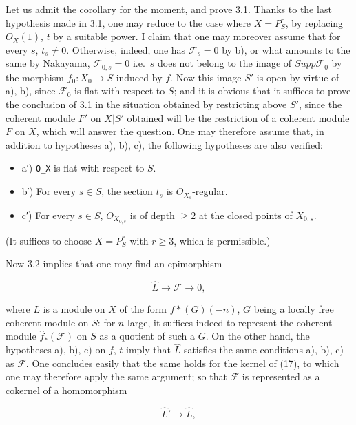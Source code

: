 \documentclass[
  11pt,
  a4paper,
]{book}
\providecommand{\tightlist}{%
  \setlength{\itemsep}{0pt}\setlength{\parskip}{0pt}}
\begin{document}
Let us admit the corollary for the moment, and prove 3.1. Thanks to the
last hypothesis made in 3.1, one may reduce to the case where
\(X = P^{r}_{S}\), by replacing \(O_{X}(1)\), \(t\) by a suitable power.
I claim that one may moreover assume that for every \(s\),
\(t_{s} \neq 0\). Otherwise, indeed, one has \(\mathcal{F}_{s} = 0\) by
b), or what amounts to the same by Nakayama, \(\mathcal{F}_{0,s} = 0\)
i.e.~\(s\) does not belong to the image of \(Supp \mathcal{F}_{0}\) by
the morphism \(f_{0}: X_{0} \to S\) induced by \(f\). Now this image
\(S'\) is open by virtue of a), b), since \(\mathcal{F}_{0}\) is flat
with respect to \(S\); and it is obvious that it suffices to prove the
conclusion of 3.1 in the situation obtained by restricting above \(S'\),
since the coherent module \(F'\) on \(X|S'\) obtained will be the
restriction of a coherent module \(F\) on \(X\), which will answer the
question. One may therefore assume that, in addition to hypotheses a),
b), c), the following hypotheses are also verified:

\begin{itemize}
\tightlist
\item
  a′) \texttt{O\_X} is flat with respect to \(S\).
\item
  b′) For every \(s \in S\), the section \(t_{s}\) is
  \(O_{X_{s}}\)-regular.
\item
  c′) For every \(s \in S\), \(O_{X_{0,s}}\) is of depth \(\geqslant 2\)
  at the closed points of \(X_{0,s}\).
\end{itemize}

(It suffices to choose \(X = P^{r}_{S}\) with \(r \geqslant 3\), which
is permissible.)

Now 3.2 implies that one may find an epimorphism

\[ \hat{L} \to \mathcal{F} \to 0, \]

where \(L\) is a module on \(X\) of the form \(f*(G)(-n)\), \(G\) being
a locally free coherent module on \(S\): for \(n\) large, it suffices
indeed to represent the coherent module \(\hat{f}_{\ast}(\mathcal{F})\)
on \(S\) as a quotient of such a \(G\). On the other hand, the
hypotheses a), b), c) on \(f\), \(t\) imply that \(\hat{L}\) satisfies
the same conditions a), b), c) as \(\mathcal{F}\). One concludes easily
that the same holds for the kernel of (17), to which one may therefore
apply the same argument; so that \(\mathcal{F}\) is represented as a
cokernel of a homomorphism

\[ \hat{L}' \to \hat{L}, \]
\end{document}

